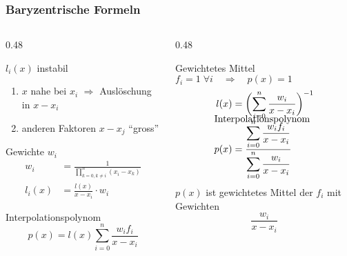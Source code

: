 %
%
%
\begin{frame}
\frametitle{Baryzentrische Formeln}
\vspace{-10pt}
\begin{columns}[t]
\begin{column}{0.48\hsize}
\begin{block}{$l_i(x)$ instabil}
\begin{enumerate}
\item
$x$ nahe bei $x_i$ $\Rightarrow$ Auslöschung in $x-x_i$
\item
anderen Faktoren $x-x_j$ ``gross''
\end{enumerate}
\end{block}
\vspace{-10pt}
\begin{block}{Gewichte $w_i$}
\vspace{-20pt}
\begin{align*}
w_i
&=
\frac{1}{\prod_{k=0,k\ne i}^n (x_i-x_k)}
\\
l_i(x)
&=
\frac{l(x)}{x-x_i}\cdot w_i
\end{align*}
\end{block}
\vspace{-10pt}
\begin{block}{Interpolationspolynom}
\vspace{-10pt}
\[
p(x)
=
l(x) \sum_{i=0}^n \frac{w_if_i}{x-x_i}
\]
\end{block}
\end{column}
\begin{column}{0.48\hsize}
\begin{block}{Gewichtetes Mittel}
$f_i=1\;\forall i\quad\Rightarrow \quad p(x) = 1$
\vspace{-5pt}
\begin{align*}
l(x)
&=
\biggl(
\sum_{i=0}^n \frac{w_i}{x-x_i}
\biggr)^{-1}\\[-10pt]
\intertext{\vspace{-5pt}%
Interpolationspolynom
\vspace{-5pt}}
p(x)
&=
\frac{\displaystyle\sum_{i=0}^n \frac{w_if_i}{x-x_i}}{\displaystyle\sum_{i=0}^n \frac{w_i}{x-x_i}}
\end{align*}
$p(x)$ ist gewichtetes Mittel der $f_i$ mit Gewichten
\[
\frac{w_i}{x-x_i}
\]
\end{block}
\end{column}
\end{columns}
\end{frame}
